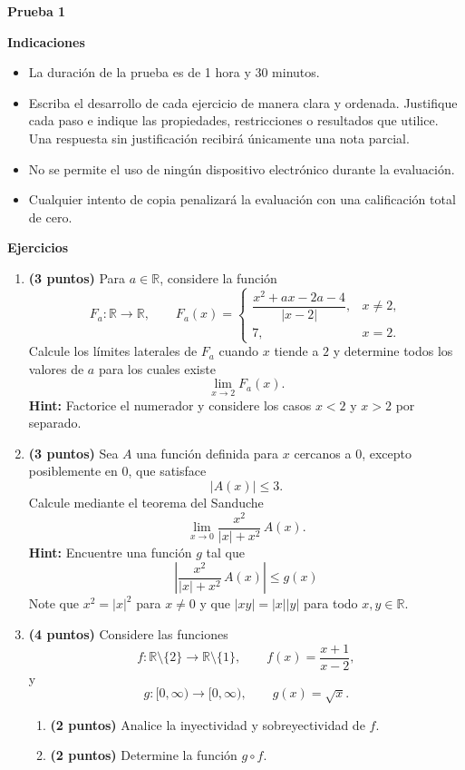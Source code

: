 \documentclass[10pt,a5paper]{article}
\begin{document}
\begin{center}
  {\color{Azul}\large\bfseries Prueba 1}
\end{center}
\noindent\textbf{Indicaciones}
\begin{itemize}
  \item La duración de la prueba es de 1 hora y 30 minutos.
  \item Escriba el desarrollo de cada ejercicio de manera clara y ordenada.
  Justifique cada paso e indique las propiedades, restricciones o resultados que
  utilice. Una respuesta sin justificación recibirá únicamente una nota parcial.
  \item No se permite el uso de ningún dispositivo electrónico durante la
  evaluación.
  \item Cualquier intento de copia penalizará la evaluación con una calificación
  total de cero.
\end{itemize}

\medskip
\noindent\textbf{Ejercicios}
\begin{enumerate}
  \item \textbf{(3 puntos)} Para $a\in\mathbb{R}$, considere la función
  \[
    F_a\colon\mathbb{R}\to\mathbb{R},
    \qquad
    F_a(x)=
    \begin{cases}
      \dfrac{x^2+ax-2a-4}{|x-2|}, & x\neq2,\\[2mm]
      7, & x=2.
    \end{cases}
  \]
  Calcule los límites laterales de $F_a$ cuando $x$ tiende a $2$ y determine
  todos los valores de $a$ para los cuales existe
  \[
    \lim_{x\to2}F_a(x).
  \]
  \textbf{Hint:} Factorice el numerador y considere los casos $x<2$ y $x>2$ por separado.
  \item \textbf{(3 puntos)} Sea $A$ una función definida para $x$ cercanos a $0$, excepto posiblemente en $0$, que satisface
  \[
    |A(x)|\leq3.
  \]
  Calcule mediante el teorema del Sanduche
  \[
    \lim_{x\to0}
    \frac{x^2}{|x|+x^2}\,A(x).
  \]
\textbf{Hint:} Encuentre una función $g$ tal que
  \[
    \left|\frac{x^2}{|x|+x^2}\,A(x)\right|\leq g(x)
  \]
  Note que $x^2=|x|^2$ para $x\neq 0$ y que $|xy|=|x||y|$ para todo $x,y\in\mathbb{R}$.
  \item \textbf{(4 puntos)} Considere las funciones
  \[
    f\colon\mathbb{R}\setminus\{2\}\to\mathbb{R}\setminus\{1\},
    \qquad
    f(x)=\frac{x+1}{x-2},
  \]
  y
  \[
    g\colon[0,\infty)\to[0,\infty),
    \qquad
    g(x)=\sqrt{x}.
  \]
  \begin{enumerate}
    \item \textbf{(2 puntos)} Analice la inyectividad y sobreyectividad de $f$.
    \item \textbf{(2 puntos)} Determine la función $g\circ f$.
  \end{enumerate}
\end{enumerate}
\end{document}
